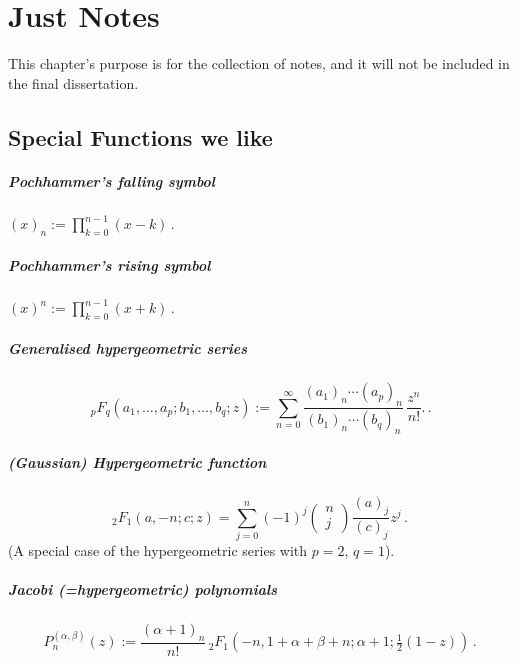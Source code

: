 \chapter*{Just Notes}
This chapter's purpose is for the collection of notes, and it will not be included in the final dissertation.

\section*{Special Functions we like}

\paragraph{Pochhammer's falling symbol} $(x)_n := \prod_{k=0}^{n-1} (x-k)\,.$
\paragraph{Pochhammer's rising symbol} $(x)^n := \prod_{k=0}^{n-1} (x+k)\,.$

\paragraph{Generalised hypergeometric series}
$${ \,{}_{p}F_{q}(a_{1},\ldots ,a_{p};b_{1},\ldots ,b_{q};z) := \sum _{n=0}^{\infty }{\frac {(a_{1})_{n}\cdots (a_{p})_{n}}{(b_{1})_{n}\cdots (b_{q})_{n}}}\,{\frac {z^{n}}{n!}}.}\,.$$

\paragraph{(Gaussian) Hypergeometric function}
$${}_2 F_1(a,-n;c;z) = \sum_{j=0}^n (-1)^j \begin{pmatrix}n \\j\end{pmatrix} \frac{(a)_j}{(c)_j}z^j\,.$$
(A special case of the hypergeometric series with $p=2$, $q=1$).

\paragraph{Jacobi (=hypergeometric) polynomials}
$$P_{n}^{{(\alpha ,\beta )}}(z) := {\frac{(\alpha +1)_{n}}{n!}}\,{}_{2}F_{1}\left(-n,1+\alpha +\beta +n;\alpha +1;{\tfrac  {1}{2}}(1-z)\right)\,.$$

